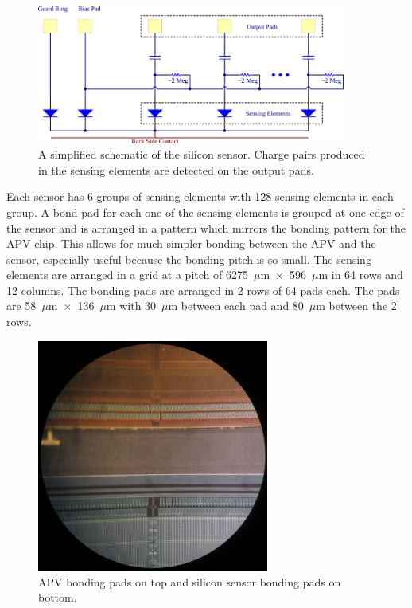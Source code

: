 \documentclass[preprint,12pt]{elsarticle}
\begin{document}
\begin{figure}[h]
\begin{center}
\includegraphics[width=4in, keepaspectratio=true, angle=0]{graphics/sensor_sch.png}
\caption{A simplified schematic of the silicon sensor.  Charge pairs produced in
the sensing elements are detected on the output pads.
\label{fig:sensor_sch}}
\end{center}
\end{figure}

Each sensor has 6 groups of sensing elements with 128 sensing elements in each
group. A bond pad for each one of the sensing elements is grouped at one edge
of the sensor and is arranged in a pattern which mirrors the bonding pattern for
the APV chip. This allows for much simpler bonding between the APV and the
sensor, especially useful because the bonding pitch is so small. The sensing
elements are arranged in a grid at a pitch of 6275~$\mu$m~$\times$~596~$\mu$m in 64 rows and 12
columns. The bonding pads are arranged in 2 rows of 64 pads each. The pads are
58~$\mu$m~$\times$~136~$\mu$m with 30~$\mu$m between each pad and 80~$\mu$m between the 2 rows.

\begin{figure}[ht]
\begin{center}
\includegraphics[width=3in, keepaspectratio=true, angle=0]{graphics/bonding_pads.jpg}
\caption{APV bonding pads on top and silicon sensor bonding pads on bottom.
\label{fig:bonding_pads}}
\end{center}
\end{figure}
\end{document}
